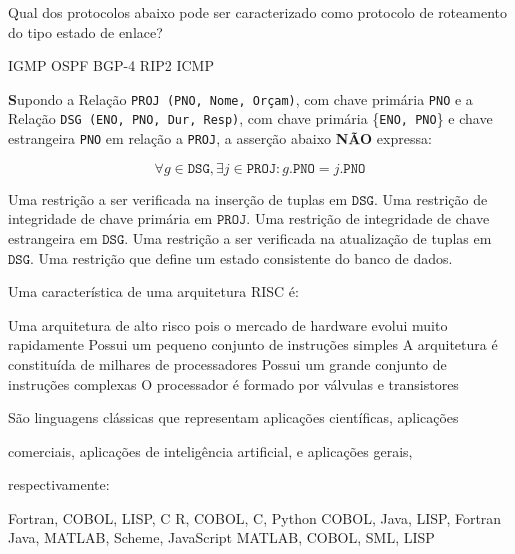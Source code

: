 \documentclass[12pt, addpoints]{exam}
\begin{document}
\begin{questions}
\question

Qual dos protocolos abaixo pode ser caracterizado como protocolo de roteamento do tipo estado de enlace?
\begin{choices}
\choice IGMP
\choice OSPF
\choice BGP-4
\choice RIP2
\choice ICMP
\end{choices}

\question

\textbf Supondo a Relação \texttt{PROJ (PNO, Nome, Orçam)}, com chave primária \texttt{PNO} e a Relação \texttt{DSG (ENO, PNO, Dur, Resp)}, com chave primária \{\texttt{ENO, PNO}\} e chave estrangeira \texttt{PNO} em relação a \texttt{PROJ}, a asserção abaixo \textbf{NÃO} expressa:



\begin{equation}\forall g \in \texttt{DSG}, \exists j \in \texttt{PROJ} : g.\texttt{PNO} = j.\texttt{PNO}\end{equation}
\begin{choices}
\choice Uma restrição a ser verificada na inserção de tuplas em $\texttt{DSG}$.
\choice Uma restrição de integridade de chave primária em $\texttt{PROJ}$.
\choice Uma restrição de integridade de chave estrangeira em $\texttt{DSG}$.
\choice Uma restrição a ser verificada na atualização de tuplas em $\texttt{DSG}$.
\choice Uma restrição que define um estado consistente do banco de dados.
\end{choices}

\question

Uma característica de uma arquitetura RISC é:
\begin{choices}
\choice Uma arquitetura de alto risco pois o mercado de hardware evolui muito rapidamente
\choice Possui um pequeno conjunto de instruções simples
\choice A arquitetura é constituída de milhares de processadores
\choice Possui um grande conjunto de instruções complexas
\choice O processador é formado por válvulas e transistores
\end{choices}

\question

São linguagens clássicas que representam aplicações científicas, aplicações 

comerciais, aplicações de inteligência artificial, e aplicações gerais,

respectivamente:
\begin{choices}
\choice Fortran, COBOL, LISP, C
\choice R, COBOL, C, Python
\choice COBOL, Java, LISP, Fortran
\choice Java, MATLAB, Scheme, JavaScript
\choice MATLAB, COBOL, SML, LISP
\end{choices}


\end{questions}
\end{document}
